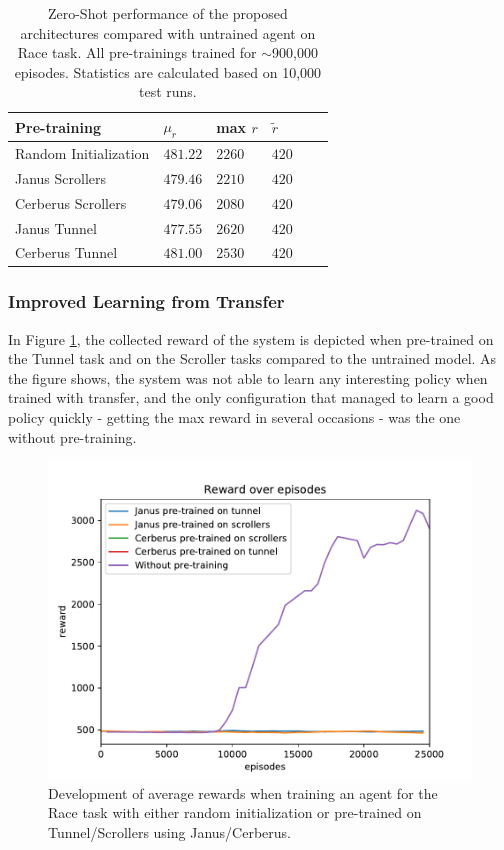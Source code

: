 \begin{table}[t!]
\begin{tabular}{llllll}
\toprule
\textbf{Pre-training}   & $\mu_r$ & max $r$ & $\widetilde{r}$ \\ \midrule
Random Initialization                           &     $481.22$     &    $2260$     &      $420$      \\ \midrule
Janus Scrollers &     $479.46$     &    $2210$     &      $420$      \\ 
Cerberus Scrollers &     $479.06$     &    $2080$     &      $420$      \\ \midrule 
Janus Tunnel    &     $477.55$     &    $2620$     &      $420$      \\ 
Cerberus Tunnel    &     $481.00$     &    $2530$     &      $420$      \\ \bottomrule 

\end{tabular}
\caption{Zero-Shot performance of the proposed architectures compared with untrained agent on Race task. All pre-trainings trained for $\sim$900,000 episodes. Statistics are calculated based on 10,000 test runs.}
\label{zero-shot-table}
\end{table}

\subsubsection{Improved Learning from Transfer}

In Figure \ref{fig:improved-learning}, the collected reward of the system is depicted when pre-trained on the Tunnel task and on the Scroller tasks compared to the untrained model. As the figure shows, the system was not able to learn any interesting policy when trained with transfer, and the only configuration that managed to learn a good policy quickly - getting the max reward in several occasions - was the one without pre-training.

\begin{figure}
    \centering
    \includegraphics[width=\columnwidth]{img/rewards.pdf}
    \caption{Development of average rewards when training an agent for the Race task with either random initialization or pre-trained on Tunnel/Scrollers using Janus/Cerberus.}
    \label{fig:improved-learning}
\end{figure}